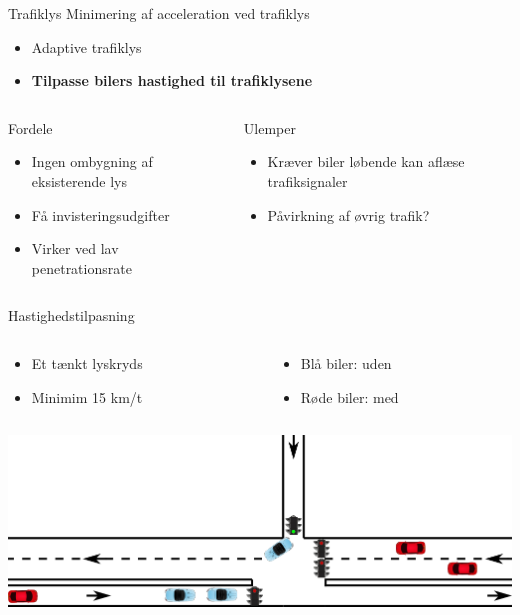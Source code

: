 \begin{frame}{Trafiklys}
Minimering af acceleration ved trafiklys
\begin{itemize}
\item Adaptive trafiklys
\item \textbf{Tilpasse bilers hastighed til trafiklysene}
\end{itemize}


\begin{center}
\begin{columns}
\begin{column}{0.4\textwidth}
Fordele
\begin{itemize}
\item Ingen ombygning af eksisterende lys
\item Få invisteringsudgifter 
\item Virker ved lav penetrationsrate
\end{itemize}
\end{column}

\begin{column}{0.5\textwidth}
Ulemper
\begin{itemize}
\item Kræver biler løbende kan aflæse trafiksignaler
\item Påvirkning af øvrig trafik?
\end{itemize}
\vspace{8mm}
\end{column}
\end{columns}
\end{center}
\end{frame}

\begin{frame}{Hastighedstilpasning}
\begin{columns}
\begin{column}{0.4\textwidth}
\begin{itemize}
\item Et tænkt lyskryds
\item Minimim 15 km/t
\end{itemize}
\end{column}
\begin{column}{0.6\textwidth}
\begin{itemize}
\item Blå biler: uden \tech
\item Røde biler: med \tech
\end{itemize}
\end{column}
\end{columns}

\vspace{3mm}
\includegraphics[width=1\textwidth]{../images/introNetworkSimple.png}
\end{frame}

